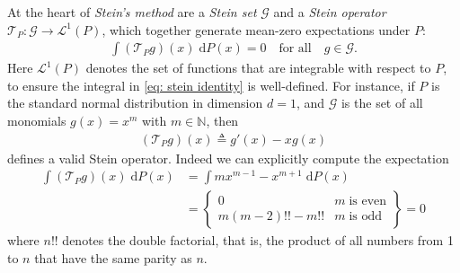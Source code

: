 \documentclass[12pt,paper=letter]{scrreprt}
\newcommand{\qtext}[1]{\quad\text{#1}\quad}
\def\naturals{\mathbb{N}} %
\def\defeq{\triangleq} %
\begin{document}
At the heart of \emph{Stein's method} are a \emph{Stein set} $\mathcal{G}$ and a \emph{Stein operator} $\mathcal{T}_P : \mathcal{G} \rightarrow \mathcal{L}^1(P)$, which together generate mean-zero expectations under $P$:
\begin{align}
    \int (\mathcal{T}_P g)(x) \; \mathrm{d}P(x) = 0 
    \qtext{for all}
    g\in\mathcal{G}. \label{eq: stein identity}
\end{align}
Here $\mathcal{L}^1(P)$ denotes the set of functions that are integrable with respect to $P$, to ensure the integral in \eqref{eq: stein identity} is well-defined.
For instance, if $P$ is the standard normal distribution in dimension $d = 1$, and $\mathcal{G}$ is the set of all monomials 
$g(x) = x^m$ with $m \in \naturals$,
%
then 
\begin{align}
(\mathcal{T}_P g)(x) \defeq g'(x) - x g(x) \label{eq: intro stein op}
\end{align}
defines a valid Stein operator. Indeed we can explicitly compute the expectation 
%
\begin{align*}
    \int (\mathcal{T}_P g)(x) \; \mathrm{d}P(x) 
    & = \int m x^{m-1} - x^{m+1} \; \mathrm{d}P(x) \\
    & = \left\{ \begin{array}{ll} 0 & m \; \text{is even} \\ m (m-2)!! - m!! & m \; \text{is odd} \end{array} \right\} = 0
\end{align*}
where $n!!$ denotes the double factorial, that is, the product of all numbers from 1 to $n$ that have the same parity as $n$.
\end{document}
